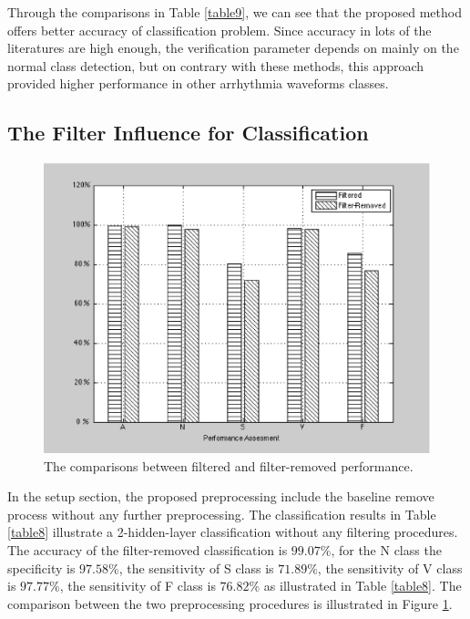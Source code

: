 \documentclass[journal]{IEEEtran}
\begin{document}
Through the comparisons in Table \ref{table9}, we can see that the proposed method offers better accuracy of classification problem. Since accuracy in lots of the literatures are high enough, the verification parameter depends on mainly on the normal class detection, but on contrary with these methods, this approach provided higher performance in  other arrhythmia waveforms classes. 

\subsection{The Filter Influence for Classification}
\begin{figure}[]
\centering
\includegraphics[width=3.2 in]{Figure5}
\caption{The comparisons between filtered and filter-removed performance.}
\label{figure5}
\end{figure}

In the setup section, the proposed preprocessing include the baseline remove process without any further preprocessing. The classification results in Table \ref{table8} illustrate a 2-hidden-layer classification without any filtering procedures. The accuracy of the filter-removed classification is $99.07\%$, for the N class the specificity is $97.58\%$, the sensitivity of S class is $71.89\%$, the sensitivity of V class is $97.77\%$, the sensitivity of F class is $76.82\%$ as illustrated in Table \ref{table8}. The comparison between the two preprocessing procedures is illustrated in Figure \ref{figure5}.
\end{document}
